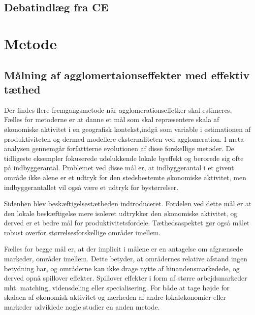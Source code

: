 \documentclass[a4paper, 12pt, titlepage]{article}
\begin{document}
\subsection{Debatindlæg fra CE}
\section{Metode}
\subsection{Målning af agglomertaionseffekter med effektiv tæthed }

Der findes flere fremgangsmetode når agglomerationseffetker skal estimeres. Fælles for metoderne er at danne et mål som skal repræsentere skala af økonomiske aktivitet i en geografisk kontekst,indgå som variable i estimationen af produktiviteten og dermed modellere eksternaliteten ved agglomeration. I meta-analysen \cite{melo2009meta} gennemgår forfattterne evolutionen af disse forskellige metoder. De tidligeste eksempler fokuserede udelukkende lokale byeffekt og berorede sig ofte på indbyggerantal. Problemet ved disse mål er, at indbyggerantal i et givent område ikke alene er et udtryk for den stedsbestemte økonomiske aktivitet, men indbyggerantallet vil også være et udtryk for bystørrelser.

Sidenhen blev beskæftigelsestætheden indtroduceret. Fordelen ved dette mål er at den lokale beskæftigelse mere isoleret udtrykker den økonomiske aktivitet, og derved er et bedre mål for produktivitetsfordele. Tæthedsaspektet gør også målet robust overfor størrelsesforskellige områder imellem. 

Fælles for begge mål er, at der implicit i målene er en antagelse om afgrænsede markeder, områder imellem. Dette betyder, at områdernes relative afstand ingen betydning har, og områderne kan ikke drage nytte af hinandensmarkedede, og derved opnå spillover effekter. Spillover effekter i form af større arbejdsmarkeder mht. matching, vidensdeling eller specialisering. For både at tage højde for skalaen af økonomisk aktivitet og nærheden af andre lokaløkonomier eller markeder udviklede nogle studier en anden metode.  
\end{document}
